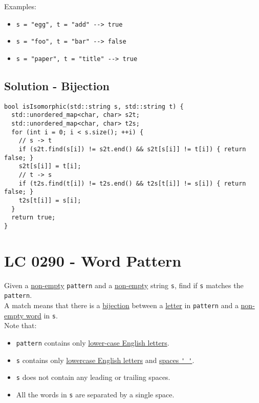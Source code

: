 {Examples:
\begin{itemize}
	\item {\colorbox{CodeBackground}{\lstinline|s = "egg", t = "add" --> true|}}
	\item {\colorbox{CodeBackground}{\lstinline|s = "foo", t = "bar" --> false|}}
	\item {\colorbox{CodeBackground}{\lstinline|s = "paper", t = "title" --> true|}}
\end{itemize}

\subsection*{Solution - Bijection}
\begin{lstlisting}
bool isIsomorphic(std::string s, std::string t) {
  std::unordered_map<char, char> s2t;
  std::unordered_map<char, char> t2s;
  for (int i = 0; i < s.size(); ++i) {
    // s -> t
    if (s2t.find(s[i]) != s2t.end() && s2t[s[i]] != t[i]) { return false; }
    s2t[s[i]] = t[i];
    // t -> s
    if (t2s.find(t[i]) != t2s.end() && t2s[t[i]] != s[i]) { return false; }
    t2s[t[i]] = s[i];
  }
  return true;
}
\end{lstlisting}

\section{LC 0290 - Word Pattern}\label{lc0290}
Given a \ul{non-empty} {\colorbox{CodeBackground}{\lstinline|pattern|}} and a \ul{non-empty} string {\colorbox{CodeBackground}{\lstinline|s|}}, find if {\colorbox{CodeBackground}{\lstinline|s|}} matches the {\colorbox{CodeBackground}{\lstinline|pattern|}}.\\

A match means that there is a \ul{bijection} between a \ul{letter} in {\colorbox{CodeBackground}{\lstinline|pattern|}} and a \ul{non-empty word} in {\colorbox{CodeBackground}{\lstinline|s|}}.\\

Note that:
\begin{itemize}
\item {\colorbox{CodeBackground}{\lstinline|pattern|}} contains only \ul{lower-case English letters}.
\item {\colorbox{CodeBackground}{\lstinline|s|}} contains only \ul{lowercase English letters} and \ul{spaces {\colorbox{CodeBackground}{\lstinline|' '|}}}.
\item {\colorbox{CodeBackground}{\lstinline|s|}} does not contain any leading or trailing spaces.
\item All the words in {\colorbox{CodeBackground}{\lstinline|s|}} are separated by a single space.
\end{itemize}

}
